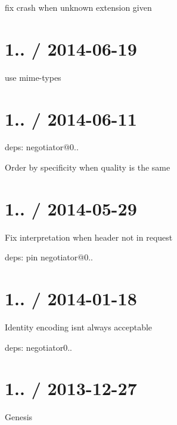 \begin{DoxyItemize}
\item fix crash when unknown extension given
\end{DoxyItemize}

\section*{1.. / 2014-\/06-\/19 }


\begin{DoxyItemize}
\item use {\ttfamily mime-\/types}
\end{DoxyItemize}

\section*{1.. / 2014-\/06-\/11 }


\begin{DoxyItemize}
\item deps\+: negotiator@0..
\begin{DoxyItemize}
\item Order by specificity when quality is the same
\end{DoxyItemize}
\end{DoxyItemize}

\section*{1.. / 2014-\/05-\/29 }


\begin{DoxyItemize}
\item Fix interpretation when header not in request
\item deps\+: pin negotiator@0..
\end{DoxyItemize}

\section*{1.. / 2014-\/01-\/18 }


\begin{DoxyItemize}
\item Identity encoding isn\textquotesingle{}t always acceptable
\item deps\+: negotiator0..
\end{DoxyItemize}

\section*{1.. / 2013-\/12-\/27 }


\begin{DoxyItemize}
\item Genesis 
\end{DoxyItemize}